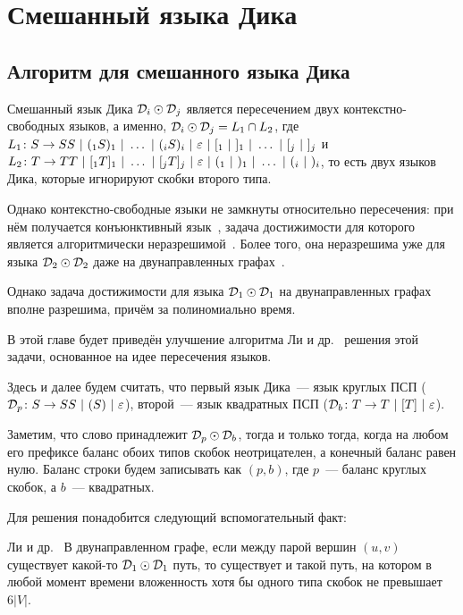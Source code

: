 \section{Смешанный языка Дика}\label{section:dyck_1_1}

\subsection{Алгоритм для смешанного языка Дика}

Смешанный язык Дика $\mathcal{D}_i \odot \mathcal{D}_j$ является пересечением двух контекстно-свободных языков, а именно, 
$\mathcal{D}_i \odot \mathcal{D}_j = L_1 \cap L_2$, где 
$L_1 \colon S \rightarrow S S~|~(_1 S )_1~|~ \dots ~|~(_i S )_i ~|~ \varepsilon ~|~ [_1 ~|~ ]_1 ~|~ \dots ~|~ [_j ~|~ ]_j$ и 
$L_2 \colon T \rightarrow T T~|~[_1 T ]_1~|~ \dots ~|~[_j T ]_j ~|~ \varepsilon ~|~ (_1 ~|~ )_1 ~|~ \dots ~|~ (_i ~|~ )_i$, 
то есть двух языков Дика, которые игнорируют скобки второго типа. 

Однако контекстно-свободные языки не замкнуты относительно пересечения: при нём получается конъюнктивный язык~\cite{Okhotin01}, задача достижимости для которого является алгоритмически неразрешимой~\cite{Hellings14}. Более того, она неразрешима уже для языка $\mathcal{D}_2 \odot \mathcal{D}_2$ даже на двунаправленных графах~\cite{Li21}. 

Однако задача достижимости для языка $\mathcal{D}_1 \odot \mathcal{D}_1$ на двунаправленных графах вполне разрешима, причём за полиномиально время.

В этой главе будет приведён улучшение алгоритма Ли и др.~\cite{Li21} решения этой задачи, основанное на идее пересечения языков.

\begin{note}\label{fact:intersection}

  Здесь и далее будем считать, что первый язык Дика~--- язык круглых ПСП ($\mathcal{D}_p \colon S \rightarrow SS~|~(S)~|~\varepsilon$), второй~--- язык квадратных ПСП ($\mathcal{D}_b \colon T \rightarrow T~|~[T]~|~\varepsilon$).
\end{note}

Заметим, что слово принадлежит $\mathcal{D}_p \odot \mathcal{D}_b$, тогда и только тогда, когда на любом его префиксе баланс обоих типов скобок неотрицателен, а конечный баланс равен нулю. Баланс строки будем записывать как $(p, b)$, где $p$~--- баланс круглых скобок, а $b$~--- квадратных.

Для решения понадобится следующий вспомогательный факт:

\begin{lemma}{Ли и др.~\cite{Li21}}\label{lm:dyck_6v}
  В двунаправленном графе, если между парой вершин $(u, v)$ существует какой-то $\mathcal{D}_1 \odot \mathcal{D}_1$ путь, то существует и такой путь, на котором в любой момент времени вложенность хотя бы одного типа скобок не превышает $6 |V|$.
\end{lemma}

